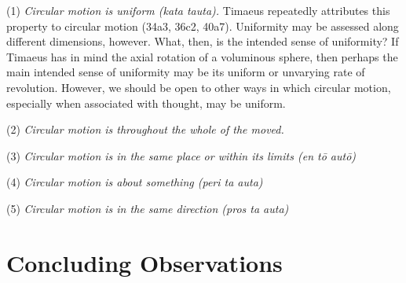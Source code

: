 (1) \emph{Circular motion is uniform (\emph{kata tauta}).} Timaeus repeatedly attributes this property to circular motion (34a3, 36c2, 40a7). Uniformity may be assessed along different dimensions, however. What, then, is the intended sense of uniformity? If Timaeus has in mind the axial rotation of a voluminous sphere, then perhaps the main intended sense of uniformity may be its uniform or unvarying rate of revolution. However, we should be open to other ways in which circular motion, especially when associated with thought, may be uniform.

(2) \emph{Circular motion is throughout the whole of the moved.}

(3) \emph{Circular motion is in the same place or within its limits (\emph{en tō autō})}

(4) \emph{Circular motion is about something (\emph{peri ta auta})}

(5) \emph{Circular motion is in the same direction (\emph{pros ta auta})}


\section{Concluding Observations} %
\label{sec:concluding_observations_cr}




